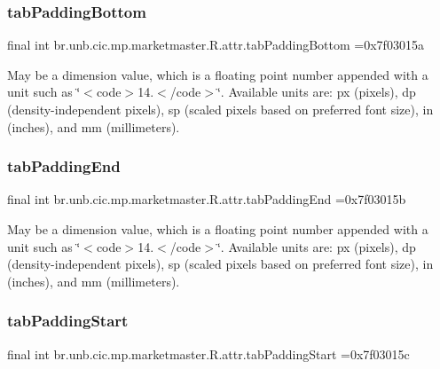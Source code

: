 \subsubsection{\texorpdfstring{tab\+Padding\+Bottom}{tabPaddingBottom}}
{\footnotesize\ttfamily final int br.\+unb.\+cic.\+mp.\+marketmaster.\+R.\+attr.\+tab\+Padding\+Bottom =0x7f03015a\hspace{0.3cm}{\ttfamily [static]}}

May be a dimension value, which is a floating point number appended with a unit such as \char`\"{}$<$code$>$14.\+5sp$<$/code$>$\char`\"{}. Available units are\+: px (pixels), dp (density-\/independent pixels), sp (scaled pixels based on preferred font size), in (inches), and mm (millimeters). \mbox{\label{classbr_1_1unb_1_1cic_1_1mp_1_1marketmaster_1_1R_1_1attr_a838cd9d6b1c9ad727922ad8d594d6d11}} 
\subsubsection{\texorpdfstring{tab\+Padding\+End}{tabPaddingEnd}}
{\footnotesize\ttfamily final int br.\+unb.\+cic.\+mp.\+marketmaster.\+R.\+attr.\+tab\+Padding\+End =0x7f03015b\hspace{0.3cm}{\ttfamily [static]}}

May be a dimension value, which is a floating point number appended with a unit such as \char`\"{}$<$code$>$14.\+5sp$<$/code$>$\char`\"{}. Available units are\+: px (pixels), dp (density-\/independent pixels), sp (scaled pixels based on preferred font size), in (inches), and mm (millimeters). \mbox{\label{classbr_1_1unb_1_1cic_1_1mp_1_1marketmaster_1_1R_1_1attr_a7d00639c4a29e70ee0cb89bc42188bbc}} 
\subsubsection{\texorpdfstring{tab\+Padding\+Start}{tabPaddingStart}}
{\footnotesize\ttfamily final int br.\+unb.\+cic.\+mp.\+marketmaster.\+R.\+attr.\+tab\+Padding\+Start =0x7f03015c\hspace{0.3cm}{\ttfamily [static]}}

